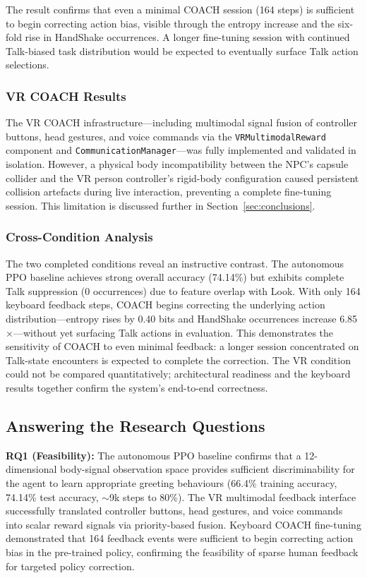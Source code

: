 \documentclass[../report.tex]{subfiles}
\begin{document}
    The result confirms that even a minimal COACH session (164 steps) is sufficient to begin correcting action bias, visible through the entropy increase and the six-fold rise in HandShake occurrences. A longer fine-tuning session with continued Talk-biased task distribution would be expected to eventually surface Talk action selections.

    \subsubsection{VR COACH Results}

    The VR COACH infrastructure---including multimodal signal fusion of controller buttons, head gestures, and voice commands via the \texttt{VRMultimodalReward} component and \texttt{CommunicationManager}---was fully implemented and validated in isolation. However, a physical body incompatibility between the NPC's capsule collider and the VR person controller's rigid-body configuration caused persistent collision artefacts during live interaction, preventing a complete fine-tuning session. This limitation is discussed further in Section~\ref{sec:conclusions}.

    \subsubsection{Cross-Condition Analysis}

    The two completed conditions reveal an instructive contrast. The autonomous PPO baseline achieves strong overall accuracy (74.14\%) but exhibits complete Talk suppression (0 occurrences) due to feature overlap with Look. With only 164 keyboard feedback steps, COACH begins correcting the underlying action distribution---entropy rises by 0.40 bits and HandShake occurrences increase 6.85$\times$---without yet surfacing Talk actions in evaluation. This demonstrates the sensitivity of COACH to even minimal feedback: a longer session concentrated on Talk-state encounters is expected to complete the correction. The VR condition could not be compared quantitatively; architectural readiness and the keyboard results together confirm the system's end-to-end correctness.

    \subsection{Answering the Research Questions}

    \textbf{RQ1 (Feasibility):} The autonomous PPO baseline confirms that a 12-dimensional body-signal observation space provides sufficient discriminability for the agent to learn appropriate greeting behaviours (66.4\% training accuracy, 74.14\% test accuracy, $\sim$9k steps to 80\%). The VR multimodal feedback interface successfully translated controller buttons, head gestures, and voice commands into scalar reward signals via priority-based fusion. Keyboard COACH fine-tuning demonstrated that 164 feedback events were sufficient to begin correcting action bias in the pre-trained policy, confirming the feasibility of sparse human feedback for targeted policy correction.
\end{document}
